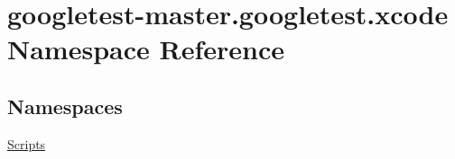 \hypertarget{namespacegoogletest-master_1_1googletest_1_1xcode}{}\section{googletest-\/master.googletest.\+xcode Namespace Reference}
\label{namespacegoogletest-master_1_1googletest_1_1xcode}
\subsection*{Namespaces}
\begin{DoxyCompactItemize}
\item 
 \mbox{\hyperlink{namespacegoogletest-master_1_1googletest_1_1xcode_1_1_scripts}{Scripts}}
\end{DoxyCompactItemize}
